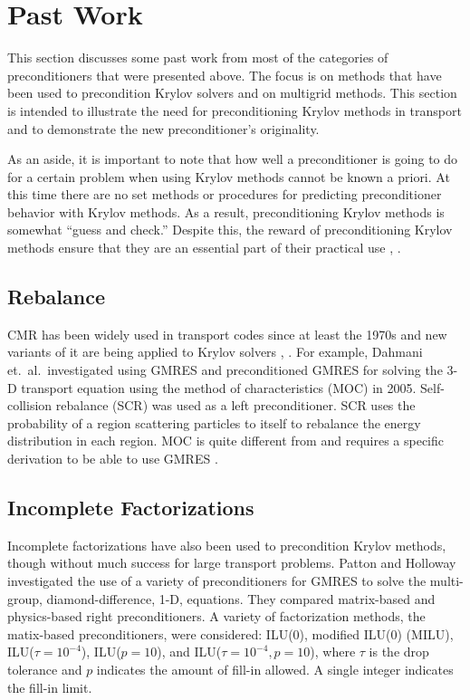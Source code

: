\section{Past Work}
This section discusses some past work from most of the categories of preconditioners that were presented above. The focus is on methods that have been used to precondition Krylov solvers and on multigrid methods. This section is intended to illustrate the need for preconditioning Krylov methods in transport and to demonstrate the new preconditioner's originality. 

As an aside, it is important to note that how well a preconditioner is going to do for a certain problem when using Krylov methods cannot be known a priori. At this time there are no set methods or procedures for predicting preconditioner behavior with Krylov methods. As a result, preconditioning Krylov methods is somewhat ``guess and check.'' Despite this, the reward of preconditioning Krylov methods ensure that they are an essential part of their practical use \cite{Knoll2004}, \cite{Benzi2002}. 

\subsection{Rebalance}
CMR has been widely used in transport codes since at least the 1970s and new variants of it are being applied to Krylov solvers \cite{Dahmani2002}, \cite{Yamamoto2005}. For example, Dahmani et.\ al.\ investigated using GMRES and preconditioned GMRES for solving the 3-D transport equation using the method of characteristics (MOC) in 2005. Self-collision rebalance (SCR) was used as a left preconditioner. SCR uses the probability of a region scattering particles to itself to rebalance the energy distribution in each region. MOC is quite different from \Sn and requires a specific derivation to be able to use GMRES \cite{Dahmani2002}. 

\subsection{Incomplete Factorizations}
Incomplete factorizations have also been used to precondition Krylov methods, though without much success for large transport problems. Patton and Holloway investigated the use of a variety of preconditioners for GMRES to solve the multi-group, diamond-difference, 1-D, \Sn equations. They compared matrix-based and physics-based right preconditioners. A variety of factorization methods, the matix-based preconditioners, were considered: ILU(0), modified ILU(0) (MILU), ILU($\tau=10^{-4}$), ILU($p=10$), and ILU($\tau=10^{-4}, p=10$), where $\tau$ is the drop tolerance and $p$ indicates the amount of fill-in allowed. A single integer indicates the fill-in limit. 


